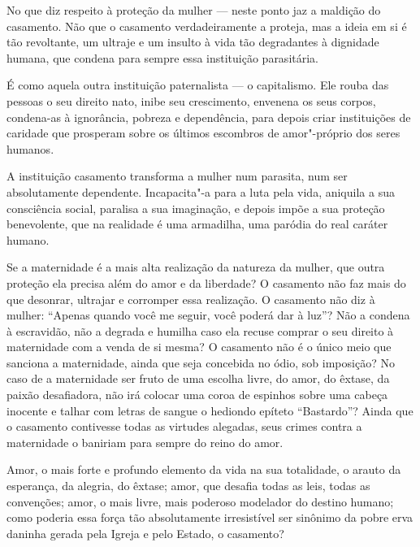No que diz respeito à proteção da mulher --- neste ponto jaz a maldição
do casamento. Não que o casamento verdadeiramente a proteja, mas a ideia
em si é tão revoltante, um ultraje e um insulto à vida tão degradantes à
dignidade humana, que condena para sempre essa instituição parasitária.

É como aquela outra instituição paternalista --- o capitalismo. Ele rouba
das pessoas o seu direito nato, inibe seu crescimento, envenena os seus
corpos, condena-as à ignorância, pobreza e dependência, para depois
criar instituições de caridade que prosperam sobre os últimos escombros de
amor"-próprio dos seres humanos.

A instituição casamento transforma a mulher num parasita, num ser
absolutamente dependente. Incapacita"-a para a luta pela vida, aniquila a
sua consciência social, paralisa a sua imaginação, e depois impõe a sua
proteção benevolente, que na realidade é uma armadilha, uma paródia do
real caráter humano.

Se a maternidade é a mais alta realização da natureza da mulher, que
outra proteção ela precisa além do amor e da liberdade? O casamento não
faz mais do que desonrar, ultrajar e corromper essa realização. O
casamento não diz à mulher: ``Apenas quando você me seguir, você poderá
dar à luz''? Não a condena à escravidão, não a degrada e humilha caso
ela recuse comprar o seu direito à maternidade com a venda de si mesma?
O casamento não é o único meio que sanciona a maternidade, ainda que
seja concebida no ódio, sob imposição? No caso de a maternidade ser
fruto de uma escolha livre, do amor, do êxtase, da paixão desafiadora,
não irá colocar uma coroa de espinhos sobre uma cabeça inocente e talhar
com letras de sangue o hediondo epíteto ``Bastardo''? Ainda que o
casamento contivesse todas as virtudes alegadas, seus crimes contra a
maternidade o baniriam para sempre do reino do amor.

Amor, o mais forte e profundo elemento da vida na sua totalidade, o arauto da
esperança, da alegria, do êxtase; amor, que desafia todas as leis, todas
as convenções; amor, o mais livre, mais poderoso modelador do destino
humano; como poderia essa força tão absolutamente irresistível ser sinônimo
da pobre erva daninha gerada pela Igreja e pelo Estado, o casamento?


